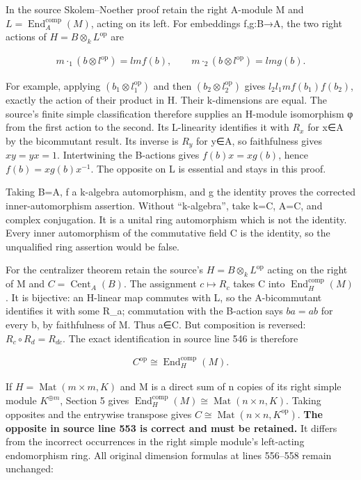 In the source Skolem--Noether proof retain the right A-module M and \(L=\operatorname{End}_{A}^{\mathrm{comp}}(M)\), acting on its left. For embeddings f,g:B→A, the two right actions of \(H=B\otimes _{k} L^{\mathrm{op}}\) are

\[\begin{gathered}
m\cdot _{1}(b\otimes l^{\mathrm{op}})=l m f(b),\qquad m\cdot _{2}(b\otimes l^{\mathrm{op}})=l m g(b).
\end{gathered}\]

For example, applying \((b_{1}\otimes l_{1}^{\mathrm{op}})\) and then \((b_{2}\otimes l_{2}^{\mathrm{op}})\) gives \(l_{2} l_{1} m f(b_{1})f(b_{2})\), exactly the action of their product in H. Their k-dimensions are equal. The source's finite simple classification therefore supplies an H-module isomorphism φ from the first action to the second. Its L-linearity identifies it with \(R_{x}\) for x∈A by the bicommutant result. Its inverse is \(R_{y}\) for y∈A, so faithfulness gives \(xy=yx=1\). Intertwining the B-actions gives \(f(b)x=xg(b)\), hence \(f(b)=xg(b)x^{-1}\). The opposite on L is essential and stays in this proof.

Taking B=A, f a k-algebra automorphism, and g the identity proves the corrected inner-automorphism assertion. Without ``k-algebra'', take k=C, A=C, and complex conjugation. It is a unital ring automorphism which is not the identity. Every inner automorphism of the commutative field C is the identity, so the unqualified ring assertion would be false.

For the centralizer theorem retain the source's \(H=B\otimes _{k} L^{\mathrm{op}}\) acting on the right of M and \(C=\operatorname{Cent}_{A}(B)\). The assignment \(c\mapsto R_{c}\) takes C into \(\operatorname{End}_{H}^{\mathrm{comp}}(M)\). It is bijective: an H-linear map commutes with L, so the A-bicommutant identifies it with some R\_a; commutation with the B-action says \(ba=ab\) for every b, by faithfulness of M. Thus a∈C. But composition is reversed: \(R_{c}\circ R_{d}=R_{dc}\). The exact identification in source line 546 is therefore

\[\begin{gathered}
C^{\mathrm{op}} \cong \operatorname{End}_{H}^{\mathrm{comp}}(M).
\end{gathered}\]

If \(H=\operatorname{Mat}(m\times m,K)\) and M is a direct sum of n copies of its right simple module \(K^{\oplus m}\), Section 5 gives \(\operatorname{End}_{H}^{\mathrm{comp}}(M)\cong \operatorname{Mat}(n\times n,K)\). Taking opposites and the entrywise transpose gives \(C\cong \operatorname{Mat}(n\times n,K^{\mathrm{op}})\). \textbf{The opposite in source line 553 is correct and must be retained.} It differs from the incorrect occurrences in the right simple module's left-acting endomorphism ring. All original dimension formulas at lines 556--558 remain unchanged:

